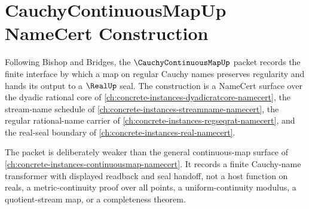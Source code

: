 \chapter{CauchyContinuousMapUp NameCert Construction}
\label{ch:concrete-instances-cauchycontinuousmap-namecert}

Following Bishop and Bridges, the $\CauchyContinuousMapUp$ packet records the finite interface by which a map on regular Cauchy names preserves regularity and hands its output to a $\RealUp$ seal. The construction is a NameCert surface over the dyadic rational core of \autoref{ch:concrete-instances-dyadicratcore-namecert}, the stream-name schedule of \autoref{ch:concrete-instances-streamname-namecert}, the regular rational-name carrier of \autoref{ch:concrete-instances-regseqrat-namecert}, and the real-seal boundary of \autoref{ch:concrete-instances-real-namecert}.

The packet is deliberately weaker than the general continuous-map surface of \autoref{ch:concrete-instances-continuousmap-namecert}. It records a finite Cauchy-name transformer with displayed readback and seal handoff, not a host function on reals, a metric-continuity proof over all points, a uniform-continuity modulus, a quotient-stream map, or a completeness theorem.

